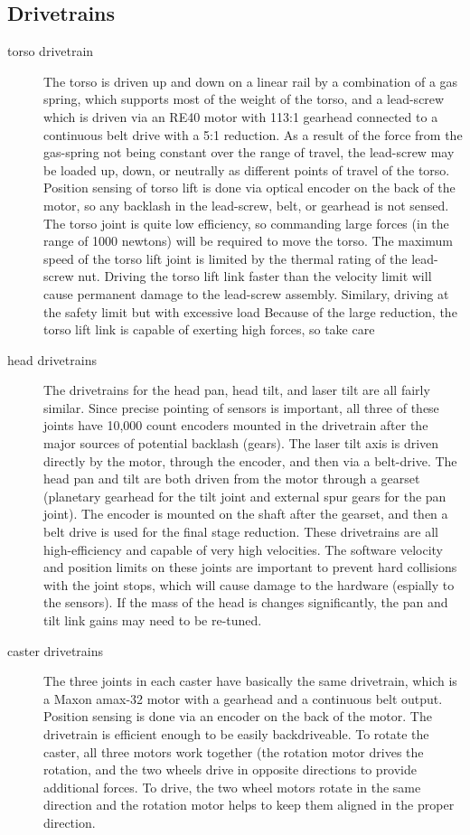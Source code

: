 \subsection{Drivetrains}
\begin{description}
\item[torso drivetrain]
The torso is driven up and down on a linear rail by a combination of a gas spring, which supports most of the weight of the torso, and a lead-screw which is driven via an RE40 motor with 113:1 gearhead connected to a continuous belt drive with a  5:1 reduction.  As a result of the force from the gas-spring not being constant over the range of travel, the lead-screw may be loaded up, down, or neutrally as different points of travel of the torso.  Position sensing of torso lift is done via optical encoder on the back of the motor, so any backlash in the lead-screw, belt, or gearhead is not sensed.  The torso joint is quite low efficiency, so commanding large forces (in the range of 1000 newtons) will be required to move the torso.  The maximum speed of the torso lift joint is limited by the thermal rating of the lead-screw nut.  Driving the torso lift link faster than the velocity limit will cause permanent damage to the lead-screw assembly.  Similary, driving at the safety limit but with excessive load
Because of the large reduction, the torso lift link is capable of exerting high forces, so take care

\item[head drivetrains]
The drivetrains for the head pan, head tilt, and laser tilt are all fairly similar.  Since precise pointing of sensors is important, all three of these joints have 10,000 count encoders mounted in the drivetrain after the major sources of potential backlash (gears).  The laser tilt axis is driven directly by the motor, through the encoder, and then via a belt-drive.  The head pan and tilt are both driven from the motor through a gearset (planetary gearhead for the tilt joint and external spur gears for the pan joint).  The encoder is mounted on the shaft after the gearset, and then a belt drive is used for the final stage reduction.  These drivetrains are all high-efficiency and capable of very high velocities.  The software velocity and position limits on these joints are important to prevent hard collisions with the joint stops, which will cause damage to the hardware (espially to the sensors).  If the mass of the head is changes significantly, the pan and tilt link gains may need to be re-tuned.

\item[caster drivetrains]
The three joints in each caster have basically the same drivetrain, which is a Maxon amax-32 motor with a gearhead and a continuous belt output.  Position sensing is done via an encoder on the back of the motor.  The drivetrain is efficient enough to be easily backdriveable.  To rotate the caster, all three motors work together (the rotation motor drives the rotation, and the two wheels drive in opposite directions to provide additional forces.  To drive, the two wheel motors rotate in the same direction and the rotation motor helps to keep them aligned in the proper direction.


\end{description}
